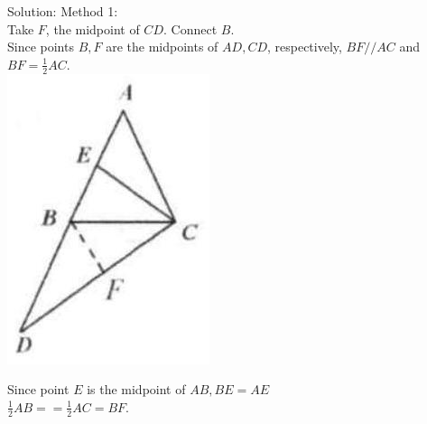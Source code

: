 \documentclass[10pt]{article}
\begin{document}
Solution:
Method 1:\\
Take \(F\), the midpoint of \(C D\). Connect \(B\).\\
Since points \(B, F\) are the midpoints of \(A D, C D\), respectively, \(B F / / A C\) and \(B F=\frac{1}{2} A C\).\\
\includegraphics[max width=\textwidth, center]{2025_04_17_97bc1f7e44d93c271a88g-039}

Since point \(E\) is the midpoint of \(A B, B E=A E\)\\
\(\frac{1}{2} A B==\frac{1}{2} A C=B F\).
\end{document}

